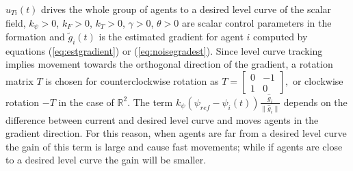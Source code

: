 $u_{Ti}(t)$ drives the whole group of agents to a desired level curve of the scalar field, %
$k_{\psi}>0$, $k_F>0$, $k_T>0$, $\gamma >0$, $\theta > 0$ are scalar control parameters in the formation  
and $\tilde{g}_i(t)$ is the estimated gradient for agent $i$ computed by equations (\ref{eq:estgradient}) or (\ref{eq:noisegradest}). Since level curve tracking implies movement towards the orthogonal  direction of the gradient, a rotation matrix $T$ is chosen for counterclockwise rotation as 
$
T=
\begin{bmatrix}
0 & -1 \\
1  & 0
\end{bmatrix},
$
or clockwise rotation $-T$ in the case of $\mathbb{R}^2$.  The term $k_{\psi}(\psi_{ref}-\psi_i(t))\frac{\hat{g}_i}{\|\hat{g}_i\|}$ depends on the difference between current and desired level curve and moves agents in the gradient direction. For this reason, when agents are far from a desired level curve the gain of this term is large and cause fast movements;  while if agents are close to a desired level curve the gain will be smaller.

%

